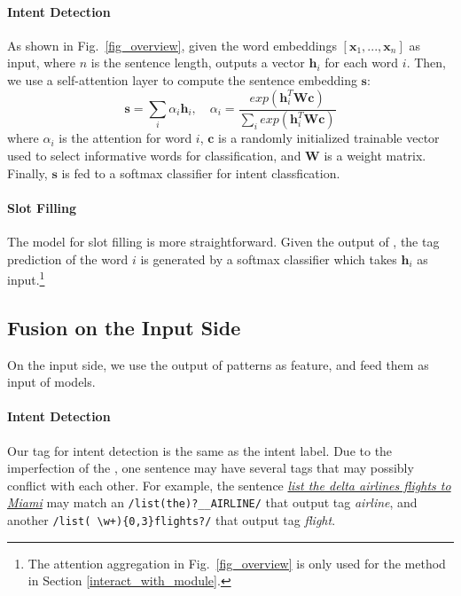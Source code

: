 \paragraph{Intent Detection}
As shown in Fig.~\ref{fig_overview}, given the word embeddings $[\textbf{x}_1, ..., \textbf{x}_n]$ as input, where $n$ is the sentence length, \BLSTM outputs a vector $\textbf{h}_i$ for each word $i$.
Then, we use a self-attention layer to compute the sentence embedding $\textbf{s}$:
\begin{equation}
\textbf{s} = \sum_{i}{\alpha_i\textbf{h}_i}, \quad \alpha_i=\frac{exp(\textbf{h}_i^T\textbf{Wc})}{\sum_{i}{exp(\textbf{h}_i^T\textbf{Wc})}}
\label{eq:simple_att}
\end{equation}
where  $\alpha_i$ is the attention for word $i$, $\textbf{c}$ is a randomly initialized trainable vector used to select informative words for classification, and $\textbf{W}$ is a weight matrix.
Finally, $\textbf{s}$ is fed to a softmax classifier for intent classfication.

\paragraph{Slot Filling}
The model for slot filling is more straightforward. Given the output of \BLSTM, the tag prediction of the word $i$ is generated by a
softmax classifier which takes $\textbf{h}_i$ as input.\footnote{The attention aggregation in Fig.~\ref{fig_overview} is only used for the
method in Section \ref{interact_with_module}.}


\subsection{Fusion on the Input Side}
\label{fusion_with_input}
On the input side, we use the output of \RE patterns as feature, and feed them as input of \NN models.
\paragraph{Intent Detection}
Our \RE tag for intent detection is the same as the intent label.
Due to the imperfection of the \REs, one sentence may have several \RE tags that may possibly conflict with each other. For example, the
sentence \textsl{\underline{list the delta airlines flights to Miami}} may match an \RE \texttt{/list(\;the)?\;\_\_AIRLINE/} that output
tag \emph{airline}, and another \RE \texttt{/list(\,\textbackslash w+)\{0,3\}\;flights?/} that output tag \emph{flight}.

